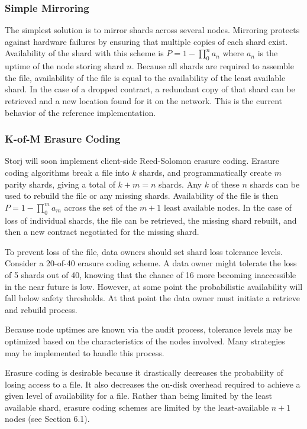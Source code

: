\documentclass[a4paper,10pt]{article}
\begin{document}
\subsubsection{Simple Mirroring}
The simplest solution is to mirror shards across several nodes. Mirroring protects against hardware failures by ensuring that multiple copies of each shard exist. Availability of the shard with this scheme is $ P = 1 - \prod_{0}^{n} a_{n} $ where $ a_{n} $ is the uptime of the node storing shard $ n $. Because all shards are required to assemble the file, availability of the file is equal to the availability of the least available shard. In the case of a dropped contract, a redundant copy of that shard can be retrieved and a new location found for it on the network. This is the current behavior of the reference implementation.

\subsubsection{K-of-M Erasure Coding}
Storj will soon implement client-side Reed-Solomon erasure coding. Erasure coding algorithms break a file into $ k $ shards, and programmatically create $ m $ parity shards, giving a total of $ k + m = n $ shards. Any $ k $ of these $ n $ shards can be used to rebuild the file or any missing shards. Availability of the file is then $ P = 1 - \prod_{0}^{m} a_{m} $  across the set of the $m + 1$ least available nodes. In the case of loss of individual shards, the file can be retrieved, the missing shard rebuilt, and then a new contract negotiated for the missing shard.

To prevent loss of the file, data owners should set shard loss tolerance levels. Consider a 20-of-40 erasure coding scheme. A data owner might tolerate the loss of 5 shards out of 40, knowing that the chance of 16 more becoming inaccessible in the near future is low. However, at some point the probabilistic availability will fall below safety thresholds. At that point the data owner must initiate a retrieve and rebuild process.

Because node uptimes are known via the audit process, tolerance levels may be optimized based on the characteristics of the nodes involved. Many strategies may be implemented to handle this process.

Erasure coding is desirable because it drastically decreases the probability of losing access to a file. It also decreases the on-disk overhead required to achieve a given level of availability for a file. Rather than being limited by the least available shard, erasure coding schemes are limited by the least-available $ n + 1 $ nodes (see Section 6.1).
\end{document}
